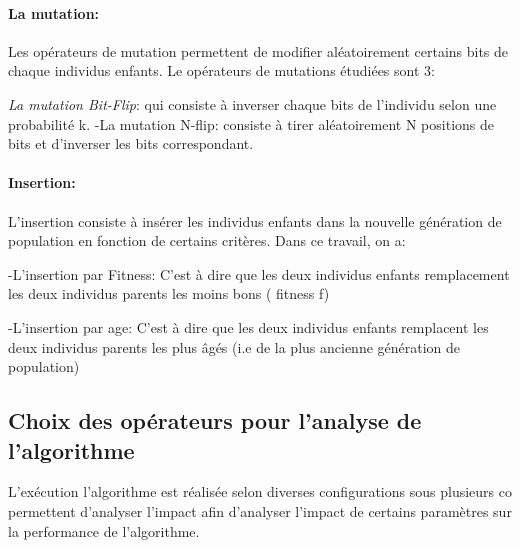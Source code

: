 \documentclass{article}
\begin{document}
\paragraph{ La mutation:}
Les opérateurs de mutation permettent de modifier aléatoirement certains bits de chaque individus enfants. Le opérateurs de mutations étudiées sont 3:

\emph{La mutation Bit-Flip}: qui consiste à inverser chaque bits de l'individu selon une probabilité k.
-La mutation N-flip: consiste à tirer aléatoirement N positions de bits et d'inverser les bits correspondant.

\paragraph{Insertion:}
L'insertion consiste à insérer les individus enfants dans la nouvelle génération de population en fonction de certains critères. Dans ce travail, on a:

-L'insertion par Fitness: C'est à dire que les deux individus enfants remplacement les deux individus parents les moins bons ( fitness f)

-L'insertion par age: C'est à dire que les deux individus enfants remplacent les deux individus parents les plus âgés (i.e de la plus ancienne génération de population)

\subsection{Choix des opérateurs pour l'analyse de l'algorithme}
L'exécution l'algorithme est réalisée selon diverses configurations sous plusieurs co permettent d'analyser l'impact afin d'analyser l'impact de certains paramètres sur la performance de l'algorithme.
\end{document}
